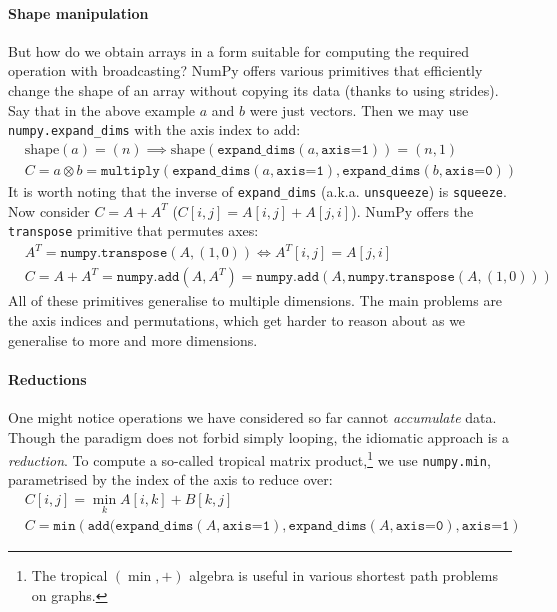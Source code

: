 \paragraph{Shape manipulation} But how do we obtain arrays in a form suitable for computing the required operation with broadcasting? NumPy offers various primitives that efficiently change the shape of an array without copying its data (thanks to using strides). Say that in the above example $a$ and $b$ were just vectors. Then we may use \texttt{numpy.expand\_dims} with the axis index to add:
\begin{align*}
&\mathrm{shape}(a) = (n) \implies \mathrm{shape}(\texttt{expand\_dims}(a, \texttt{axis=1})) = (n, 1) \\
&C = a \otimes b = \texttt{multiply} \left( \texttt{expand\_dims}(a, \texttt{axis=1}), \texttt{expand\_dims}(b, \texttt{axis=0}) \right)
\end{align*}
It is worth noting that the inverse of \texttt{expand\_dims} (a.k.a. \texttt{unsqueeze}) is \texttt{squeeze}. Now consider $C = A + A^T$ ($C[i, j] = A[i, j] + A[j, i]$). NumPy offers the \texttt{transpose} primitive that permutes axes:
\begin{align*}
&A^T = \texttt{numpy.transpose}(A, (1, 0)) \iff A^T[i, j] = A[j, i] \\
&C = A + A^T = \texttt{numpy.add}(A, A^T) = \texttt{numpy.add}(A, \texttt{numpy.transpose}(A, (1, 0))) 
\end{align*}
All of these primitives generalise to multiple dimensions. The main problems are the axis indices and permutations, which get harder to reason about as we generalise to more and more dimensions. 

\paragraph{Reductions}

One might notice operations we have considered so far cannot \textit{accumulate} data. Though the paradigm does not forbid simply looping, the idiomatic approach is a \textit{reduction}. To compute a so-called tropical matrix product,\footnote{The tropical $(\min, +)$ algebra is useful in various shortest path problems on graphs.} we use \texttt{numpy.min}, parametrised by the index of the axis to reduce over:
\begin{align*}
&C[i, j] = \min_k A[i, k] + B[k, j] \\
&C = \texttt{min} \left( \texttt{add}(\texttt{expand\_dims}(A, \texttt{axis=1}), \texttt{expand\_dims}(A, \texttt{axis=0}), \texttt{axis=1} \right)
\end{align*}

